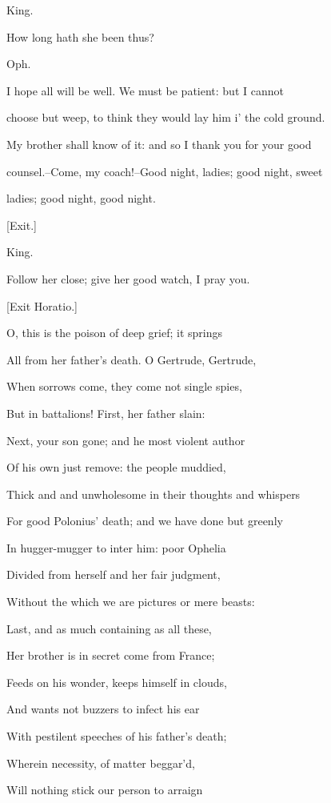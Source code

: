 \documentclass[12pt]{book}
\begin{document}
King.

How long hath she been thus?



Oph.

I hope all will be well. We must be patient: but I cannot

choose but weep, to think they would lay him i' the cold ground.

My brother shall know of it: and so I thank you for your good

counsel.--Come, my coach!--Good night, ladies; good night, sweet

ladies; good night, good night.



[Exit.]



King.

Follow her close; give her good watch, I pray you.



[Exit Horatio.]



O, this is the poison of deep grief; it springs

All from her father's death. O Gertrude, Gertrude,

When sorrows come, they come not single spies,

But in battalions! First, her father slain:

Next, your son gone; and he most violent author

Of his own just remove: the people muddied,

Thick and and unwholesome in their thoughts and whispers

For good Polonius' death; and we have done but greenly

In hugger-mugger to inter him: poor Ophelia

Divided from herself and her fair judgment,

Without the which we are pictures or mere beasts:

Last, and as much containing as all these,

Her brother is in secret come from France;

Feeds on his wonder, keeps himself in clouds,

And wants not buzzers to infect his ear

With pestilent speeches of his father's death;

Wherein necessity, of matter beggar'd,

Will nothing stick our person to arraign
\end{document}

